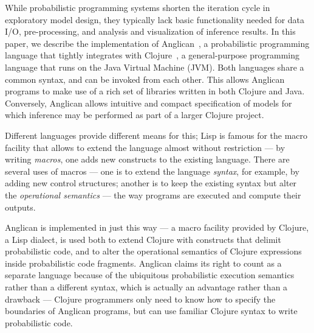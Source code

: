 \documentclass[preprint]{sigplanconf}
\begin{document}
While probabilistic programming systems shorten the iteration cycle in
exploratory model design, they typically lack basic functionality needed for
data I/O, pre-processing, and analysis and visualization of inference results.
In this paper, we describe the implementation of
Anglican~\cite{TMW15, Anglican}, a probabilistic
programming language that tightly integrates with
Clojure~\cite{H08,Clojure}, a general-purpose programming language
that runs on the Java Virtual Machine (JVM). Both languages share a common
syntax, and can be invoked from each other. This allows Anglican programs to
make use of a rich set of libraries written in both Clojure and Java.
Conversely, Anglican allows intuitive and compact specification of models for
which inference may be performed as part of a larger Clojure project.

\iftoggle{full}{%
There are several ways to build a programming language
on top of or besides another language.  The easiest is an
interpreter --- a program that reads a program, in its entirety
or line-by-line, and executes it by applying operational
semantics of a certain kind to the language. \textsc{Basic} is
famous for line-by-line interpreted implementations.

Another approach is to write a compiler, either to a virtual
architecture, so called p-code or byte-code, or to real
hardware. Here, the whole program is translated from the
`higher-level' source language to a `lower-level' object
language, which can be directly executed, either by hardware or
by an interpreter --- but the latter interpreter can be made
simpler and more efficient  than an interpreter for the source
language.

On top of these two approaches are methods in which a new
language is implemented `inside' another language of the same
level of abstraction. 
}{%
One way to implement a programming language is to embed it within another language.
}%
Different languages provide different
means for this; Lisp is famous for the macro facility
that allows to extend the language almost without
restriction --- by writing \textit{macros}, one adds new
constructs to the existing language. There are several uses of
macros --- one is to extend the language \textit{syntax}, for
example, by adding new control structures; another is to keep
the existing syntax but alter the \textit{operational semantics}
--- the way programs are executed and compute their outputs.

Anglican is implemented in just this way --- a macro facility
provided by Clojure, a Lisp dialect, is used both to extend
Clojure with constructs that delimit probabilistic code, and to
alter the operational semantics of Clojure expressions inside
probabilistic code fragments. Anglican claims its right to count
as a separate language because of the ubiquitous probabilistic
execution semantics rather than a different syntax,
which is actually an advantage rather than a drawback ---
Clojure programmers only need to know how to specify the
boundaries of Anglican programs, but can use familiar Clojure
syntax to write probabilistic code.
\end{document}
